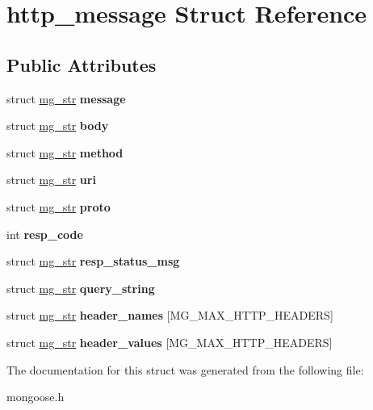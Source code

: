 \hypertarget{structhttp__message}{}\section{http\+\_\+message Struct Reference}
\label{structhttp__message}
\subsection*{Public Attributes}
\begin{DoxyCompactItemize}
\item 
\mbox{\label{structhttp__message_a005f4310b3d6f7f2c818e4dff1c81d10}} 
struct \hyperlink{structmg__str}{mg\+\_\+str} {\bfseries message}
\item 
\mbox{\label{structhttp__message_ab2e0f6d6abe3879d9f85238ae9c10fd5}} 
struct \hyperlink{structmg__str}{mg\+\_\+str} {\bfseries body}
\item 
\mbox{\label{structhttp__message_a446deffe0f2da170fb9216fd5c8812d2}} 
struct \hyperlink{structmg__str}{mg\+\_\+str} {\bfseries method}
\item 
\mbox{\label{structhttp__message_a2f8d9e674965443571fd6e581393dd62}} 
struct \hyperlink{structmg__str}{mg\+\_\+str} {\bfseries uri}
\item 
\mbox{\label{structhttp__message_aafd1525884e7c83d781d86c063ec1f4f}} 
struct \hyperlink{structmg__str}{mg\+\_\+str} {\bfseries proto}
\item 
\mbox{\label{structhttp__message_a1c4e12c873f1e4d9711d470e2e32fa65}} 
int {\bfseries resp\+\_\+code}
\item 
\mbox{\label{structhttp__message_ae819bf6100f781e15515c01bf03f5a76}} 
struct \hyperlink{structmg__str}{mg\+\_\+str} {\bfseries resp\+\_\+status\+\_\+msg}
\item 
\mbox{\label{structhttp__message_a899c4cefcdda3ba4fbafcfb05a85bba5}} 
struct \hyperlink{structmg__str}{mg\+\_\+str} {\bfseries query\+\_\+string}
\item 
\mbox{\label{structhttp__message_ad0a1f9898353bfcc80ab7f2f0a22adb0}} 
struct \hyperlink{structmg__str}{mg\+\_\+str} {\bfseries header\+\_\+names} \mbox{[}M\+G\+\_\+\+M\+A\+X\+\_\+\+H\+T\+T\+P\+\_\+\+H\+E\+A\+D\+E\+RS\mbox{]}
\item 
\mbox{\label{structhttp__message_a95a0bfefd3a05bb3db52ce50a2ef71f4}} 
struct \hyperlink{structmg__str}{mg\+\_\+str} {\bfseries header\+\_\+values} \mbox{[}M\+G\+\_\+\+M\+A\+X\+\_\+\+H\+T\+T\+P\+\_\+\+H\+E\+A\+D\+E\+RS\mbox{]}
\end{DoxyCompactItemize}


The documentation for this struct was generated from the following file\+:\begin{DoxyCompactItemize}
\item 
mongoose.\+h\end{DoxyCompactItemize}

